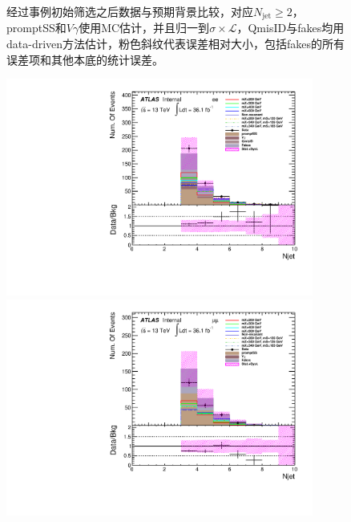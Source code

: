 \begin{figure}[h]
\begin{minipage}[t]{0.33\linewidth}
\end{minipage}
\caption{经过事例初始筛选之后数据与预期背景比较，对应$N_{\text{jet}}\geq2$，promptSS和$V\gamma$使用MC估计，并且归一到$\sigma\times\mathcal{L}$，QmisID与fakes均用data-driven方法估计，粉色斜纹代表误差相对大小，包括fakes的所有误差项和其他本底的统计误差。}
\label{fig:dataMC_low_Njet_CR:numOfjet}
\end{figure}

\begin{figure}[h]
\begin{minipage}[t]{0.33\linewidth}
\centering
\includegraphics[width=0.9\textwidth,angle=-90]{fig/dataMC_high_Njet_CR/numOfjet_ee.pdf}
\end{minipage}
\begin{minipage}[t]{0.33\linewidth}
\centering
\includegraphics[width=0.9\textwidth,angle=-90]{fig/dataMC_high_Njet_CR/numOfjet_mumu.pdf}

\end{minipage}
\end{figure}
